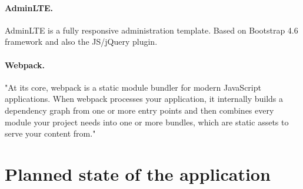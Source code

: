 \paragraph*{AdminLTE.} AdminLTE is a fully responsive administration template. Based on Bootstrap 4.6 framework and also the JS/jQuery plugin. 

\paragraph*{Webpack.}"At its core, webpack is a static module bundler for modern JavaScript applications. When webpack processes your application, it internally builds a dependency graph from one or more entry points and then combines every module your project needs into one or more bundles, which are static assets to serve your content from."







\section{Planned state of the application}
